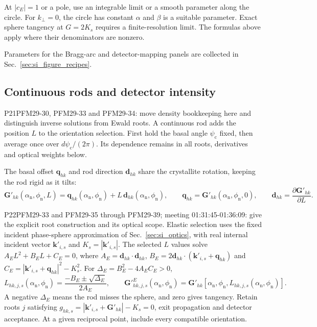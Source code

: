 At $|c_E|=1$ or a pole, use an integrable limit or a smooth parameter along the circle. For $k_\perp=0$, the circle has constant $\alpha$ and $\beta$ is a suitable parameter. Exact sphere tangency at $G=2K_s$ requires a finite-resolution limit. The formulas above apply where their denominators are nonzero.

Parameters for the Bragg-arc and detector-mapping panels are collected in Sec.~\ref{sec:si_figure_recipes}.

\subsection{Continuous rods and detector intensity}
\label{subsec:si_ewald_surface_chart}

\begin{reviewchange}{P21}{PFM29-30, PFM29-33 and PFM29-34: move density bookkeeping here and distinguish inverse solutions from Ewald roots.}
A continuous rod adds the position $L$ to the orientation selection. First hold the basal angle $\psi_{\mathrm c}$ fixed, then average once over $d\psi_{\mathrm c}/(2\pi)$. Its dependence remains in all roots, derivatives and optical weights below.
\end{reviewchange}

The basal offset $\mathbf q_{hk}$ and rod direction $\mathbf d_{hk}$ share the crystallite rotation, keeping the rod rigid as it tilts:
\begin{equation}
  {\mathbf G'}_{hk}({\alpha_{\mathrm n}},{\phi_{\mathrm n}},L)
  =\mathbf q_{hk}({\alpha_{\mathrm n}},{\phi_{\mathrm n}})
  +L\,\mathbf d_{hk}({\alpha_{\mathrm n}},{\phi_{\mathrm n}}),
  \qquad
  \mathbf q_{hk}={\mathbf G'}_{hk}({\alpha_{\mathrm n}},{\phi_{\mathrm n}},0),
  \qquad
  \mathbf d_{hk}=\frac{\partial{\mathbf G'}_{hk}}{\partial L}.
  \label{eq:si_oriented_rod_affine_L}
\end{equation}
\begin{reviewchange}{P22}{PFM29-33 and PFM29-35 through PFM29-39; meeting 01:31:45-01:36:09: give the explicit root construction and its optical scope.}
Elastic selection uses the fixed incident phase-sphere approximation of Sec.~\ref{sec:si_optics}, with real internal incident vector $\mathbf k'_{i,s}$ and $K_s=|\mathbf k'_{i,s}|$. The selected $L$ values solve $A_E L^2+B_E L+C_E=0$, where $A_E=\mathbf d_{hk}\cdot\mathbf d_{hk}$, $B_E=2\mathbf d_{hk}\cdot(\mathbf k'_{i,s}+\mathbf q_{hk})$ and $C_E=|\mathbf k'_{i,s}+\mathbf q_{hk}|^2-K_s^2$. For $\Delta_E=B_E^2-4A_EC_E>0$,
\begin{equation}
  L_{hk,j,s}({\alpha_{\mathrm n}},{\phi_{\mathrm n}})
  =\frac{-B_E\pm\sqrt{\Delta_E}}{2A_E},
  \qquad
  {\mathbf G'}^{E}_{hk,j,s}({\alpha_{\mathrm n}},{\phi_{\mathrm n}})
  ={\mathbf G'}_{hk}\!\left[{\alpha_{\mathrm n}},{\phi_{\mathrm n}},L_{hk,j,s}({\alpha_{\mathrm n}},{\phi_{\mathrm n}})\right].
  \label{eq:si_ewald_surface_chart}
\end{equation}
A negative $\Delta_E$ means the rod misses the sphere, and zero gives tangency. Retain roots $j$ satisfying $g_{hk,s}=|\mathbf k'_{i,s}+\mathbf G'_{hk}|-K_s=0$, exit propagation and detector acceptance. At a given reciprocal point, include every compatible orientation.
\end{reviewchange}

